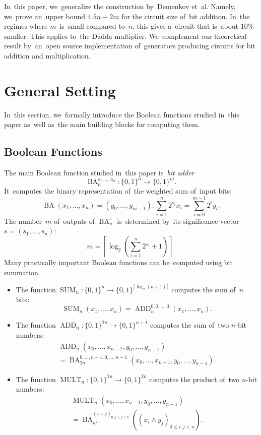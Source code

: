 \documentclass[sigconf, review, anonymous]{acmart}
\DeclareMathOperator{\SUM}{SUM}
\DeclareMathOperator{\ADD}{ADD}
\DeclareMathOperator{\MULT}{MULT}
\DeclareMathOperator{\BA}{BA}
\begin{document}
In~this paper, we~generalize the construction by~Demenkov et~al.
Namely, we~prove an~upper bound $4.5n-2m$
for the circuit size of~bit addition.
In~the regimes where $m$~is~small
compared to~$n$, this gives a~circuit that is~about $10\%$ smaller.
This applies to~the Dadda multiplier.
We~complement our theoretical result by~an~open source implementation
of~generators producing circuits for bit addition and multiplication.

\section{General Setting}
In~this section,
we~formally introduce the Boolean functions
studied in~this paper as~well as~the main building blocks
for computing them.

\subsection{Boolean Functions}
The main Boolean function studied in~this paper
is~\emph{bit adder}
\[\BA_n^{s_1, \dotsc, s_n} \colon \{0,1\}^n \to \{0,1\}^m.\]
It~computes the binary representation of~the weighted sum of~input bits:
\[\BA(x_1, \dotsc, x_n)=(y_0, \dotsc, y_{m-1}) \colon \sum_{i=1}^{n}2^{s_i}x_i=\sum_{i=0}^{m-1}2^iy_i.\]
The number~$m$ of~outputs of $\BA_n^s$ is~determined by~its significance vector $s=(s_1, \dotsc, s_n)$:
\[m=\left\lceil \log_2\left( \sum_{i=1}^{n}2^{s_i} + 1\right) \right\rceil.\]
Many practically important Boolean functions can be~computed using bit summation.
\begin{itemize}
    \item The function $\SUM_n \colon \{0,1\}^n \to \{0,1\}^{\lceil \log_2(n+1) \rceil}$
    computes the sum of~$n$ bits: \[\SUM_n(x_1, \dotsc, x_n)=\ADD_n^{0,0,\dotsc,0}(x_1, \dotsc, x_n).\]
	\item The function $\ADD_n \colon \{0,1\}^{2n} \to \{0,1\}^{n+1}$ computes the sum
	of~two $n$-bit numbers:
    \begin{multline*}
        \ADD_n(x_0, \dotsc, x_{n-1}, y_0, \dotsc, y_{n-1})\\
        =\BA_{2n}^{0,\dotsc,n-1,0,\dotsc,n-1}(x_0, \dotsc, x_{n-1}, y_0, \dotsc, y_{n-1}).
    \end{multline*}
	\item The function $\MULT_n \colon \{0,1\}^{2n} \to \{0,1\}^{2n}$ computes the product
	of~two $n$-bit numbers:
	\begin{multline*}
	\MULT_n(x_0, \dotsc, x_{n-1}, y_0, \dotsc, y_{n-1})\\=\BA_{n^2}^{(i+j)_{0 \le i, j < n}}\left(\left(x_i \land y_j\right)_{0 \le i, j < n}\right).
	\end{multline*}
\end{itemize}
\end{document}
